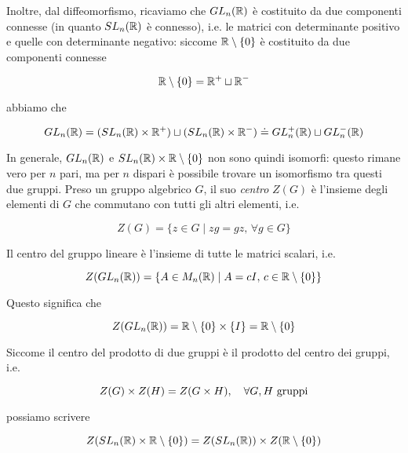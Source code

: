 Inoltre, dal diffeomorfismo, ricaviamo che $ GL_{n}(\mathbb{R}) $ è costituito da due componenti connesse (in quanto $ SL_{n}(\mathbb{R}) $ è connesso), i.e. le matrici con determinante positivo e quelle con determinante negativo: siccome $ \mathbb{R} \setminus \{0\} $ è costituito da due componenti connesse

\begin{equation}
	\mathbb{R} \setminus \{0\} = \mathbb{R}^{+} \sqcup \mathbb{R}^{-}
\end{equation}

abbiamo che

\begin{equation}
	GL_{n}(\R) = (SL_{n}(\R) \times \R^{+}) \sqcup (SL_{n}(\R) \times \R^{-}) %
	\doteq GL_{n}^{+}(\R) \sqcup GL_{n}^{-}(\R)
\end{equation}

In generale, $ GL_{n}(\mathbb{R}) $ e $ SL_{n}(\mathbb{R}) \times \mathbb{R} \setminus \{0\} $ non sono quindi isomorfi: questo rimane vero per $ n $ pari, ma per $ n $ dispari è possibile trovare un isomorfismo tra questi due gruppi.
Preso un gruppo algebrico $ G $, il suo \textit{centro} $ Z(G) $ è l'insieme  degli elementi di $ G $ che commutano con tutti gli altri elementi, i.e.

\begin{equation}
	Z(G) = \{ z \in G \mid zg = gz, \, \forall g \in G \}
\end{equation}

Il centro del gruppo lineare è l'insieme di tutte le matrici scalari, i.e.

\begin{equation}
	Z(GL_{n}(\mathbb{R})) = \{ A \in M_{n}(\mathbb{R}) \mid A = c I, \, c \in \mathbb{R} \setminus \{0\} \}
\end{equation}

Questo significa che

\begin{equation}
	Z(GL_{n}(\mathbb{R})) = \mathbb{R} \setminus \{0\} \times \{I\} = \mathbb{R} \setminus \{0\}
\end{equation}

Siccome il centro del prodotto di due gruppi è il prodotto del centro dei gruppi, i.e.

\begin{equation}
	Z(G) \times Z(H) = Z(G \times H) \qcomma \forall G,H \text{ gruppi}
\end{equation}

possiamo scrivere

\begin{equation}
	Z(SL_{n}(\mathbb{R}) \times \mathbb{R} \setminus \{0\}) = Z(SL_{n}(\mathbb{R})) \times Z(\mathbb{R} \setminus \{0\})
\end{equation}

